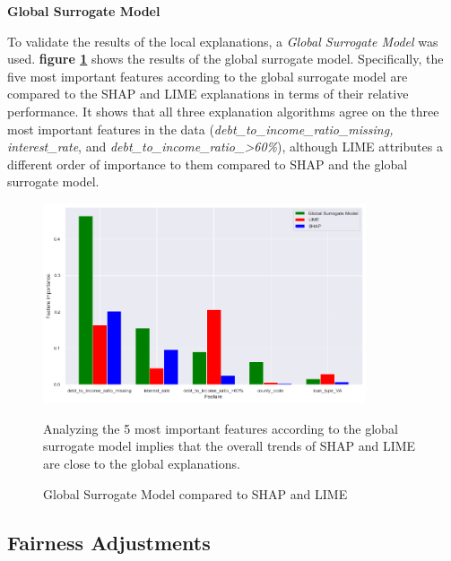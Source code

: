 \textbf{Global Surrogate Model}

To validate the results of the local explanations, a \textit{Global Surrogate Model} was used. \textbf{figure \ref{fig:Global_Surrogate}} shows the results of the global surrogate model. Specifically, the five most important features according to the global surrogate model are compared to the SHAP and LIME explanations in terms of their relative performance.
It shows that all three explanation algorithms agree on the three most important features in the data (\textit{debt\_to\_income\_ratio\_missing, interest\_rate}, and \textit{debt\_to\_income\_ratio\_>60\%}), although LIME attributes a different order of importance to them compared to SHAP and the global surrogate model.

\begin{figure}[h]
    \centering
    \includegraphics[width=0.85\textwidth]{images/CHXX_UPDATE_Surrogate_SHAP_LIME_combined.png}
    \caption{Global Surrogate Model compared to SHAP and LIME}
    \medskip
    \small
    Analyzing the 5 most important features according to the global surrogate model implies that the overall trends of SHAP and LIME are close to the global explanations.
    \label{fig:Global_Surrogate}
\end{figure}

\subsection{Fairness Adjustments}\label{Fairness Adjustments Results}